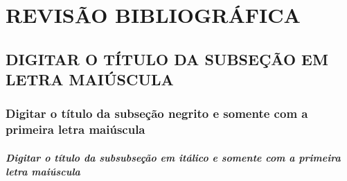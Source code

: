 \chapter{REVISÃO BIBLIOGRÁFICA}\label{cap:ch2}  



\section{DIGITAR O TÍTULO DA SUBSEÇÃO EM LETRA MAIÚSCULA}\label{sec:ch2.1}



\subsection{\textbf{Digitar o título da subseção negrito e somente com a primeira letra maiúscula}}\label{subsec:ch2.1.1}



\subsubsection{\textit{Digitar o título da subsubseção em itálico e somente com a primeira letra maiúscula}}\label{subsubsec:ch2.1.1.1}

